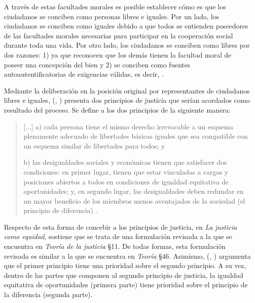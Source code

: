 A través de estas facultades morales es posible establecer cómo es que los ciudadanos se conciben como personas libres e iguales. Por un lado, los ciudadanos se conciben como iguales debido a que todos se entienden poseedores de las facultades morales necesarias para participar en la cooperación social durante toda una vida. Por otro lado, los ciudadanos se conciben como libres por dos razones: 1) ya que reconocen que los demás tienen la facultad moral de poseer una concepción del bien y 2) se conciben como fuentes autoautentificatorias de exigencias válidas, es decir,  \citep[p. 48]{Rawls_2002}.

Mediante la deliberación en la posición original por representantes de ciudadanos libres e iguales, \citeauthor{Rawls_1971} (\citeyear{Rawls_1971}, \citeyear{Rawls_2002}) presenta dos principios de justicia que serían acordados como resultado del proceso. Se define a los dos principios de la siguiente manera:

\vspace{3mm}
\begin{quote}
   [...] a) cada persona tiene el mismo derecho irrevocable a un esquema plenamente adecuado de libertades básicas iguales que sea compatible con un esquema similar de libertades para todos; y
   
   b) las desigualdades sociales y económicas tienen que satisfacer dos condiciones: en primer lugar, tienen que estar vinculadas a cargos y posiciones abiertos a todos en condiciones de igualdad equitativa de oportunidades; y, en segundo lugar, las desigualdades deben redundar en un mayor beneficio de los miembros menos aventajados de la sociedad (el principio de diferencia) \citep[p. 73]{Rawls_2002}.
\end{quote}
\vspace{3mm}

Respecto de esta forma de concebir a los principios de justicia, en \textit{La justicia como equidad}, \citet{Rawls_2002} sostiene que se trata de una formulación revisada a la que se encuentra en \textit{Teoría de la justicia} §11. De todas formas, esta formulación revisada es similar a la que se encuentra en \textit{Teoría} §46. Asimismo, \citeauthor{Rawls_1971} (\citeyear{Rawls_1971}, \citeyear{Rawls_2002}) argumenta que el primer principio tiene una prioridad sobre el segundo principio. A su vez, dentro de las partes que componen al segundo principio de justicia, la igualdad equitativa de oportunidades (primera parte) tiene prioridad sobre el principio de la diferencia (segunda parte).

